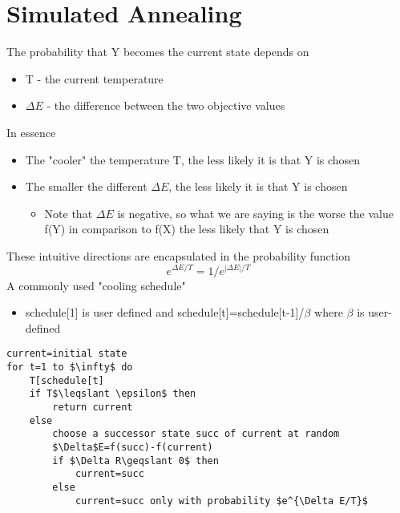 \documentclass{article}[18pt]
\begin{document}
\section{Simulated Annealing}
The probability that Y becomes the current state depends on
\begin{itemize}
	\item T - the current temperature
	\item $\Delta E$ - the difference between the two objective values
\end{itemize}
In essence
\begin{itemize}
	\item The "cooler" the temperature T, the less likely it is that Y is chosen
	\item The smaller the different $\Delta E$, the less likely it is that Y is chosen
	\begin{itemize}
		\item Note that $\Delta E$ is negative, so what we are saying is the worse the value f(Y) in comparison to f(X) the less likely that Y is chosen
	\end{itemize}
\end{itemize}
These intuitive directions are encapsulated in the probability function
$$e^{\Delta E/T}=1/e^{|\Delta E|/T}$$
A commonly used "cooling schedule"
\begin{itemize}
	\item schedule[1] is user defined and schedule[t]=schedule[t-1]/$\beta$ where $\beta$ is user-defined
\end{itemize}
\begin{lstlisting}[caption=Simulated-annealing]
current=initial state
for t=1 to $\infty$ do
	T[schedule[t]
	if T$\leqslant \epsilon$ then
		return current
	else
		choose a successor state succ of current at random
		$\Delta$E=f(succ)-f(current)
		if $\Delta R\geqslant 0$ then
			current=succ
		else
			current=succ only with probability $e^{\Delta E/T}$
\end{lstlisting}
\end{document}
